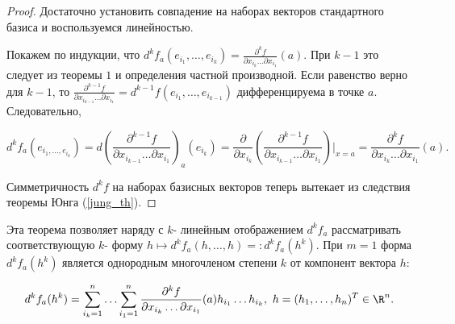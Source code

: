 \begin{proof}
    Достаточно установить совпадение на наборах векторов стандартного базиса и воспользуемся линейностью.

    Покажем по индукции, что $d^{k}f_{a}(e_{i_{1}}, \ldots, e_{i_{k}}) = \frac{\partial^k f}{\partial x_{i_{k}} \ldots \partial x_{i_{1}}}(a)$. При $k - 1$ это следует из теоремы $1$ и определения частной производной. Если равенство верно для $k - 1$, то $\frac{\partial^{k - 1} f}{\partial x_{i_{k - 1}} \ldots \partial x_{i_{1}}} = d^{k - 1}f(e_{i_{1}}, \ldots, e_{i_{k - 1}})$ дифференцируема в точке $a$. Следовательно,
    
    \[d^{k}f_{a}(e_{i_{1}, \ldots, e_{i_{k}}}) = d\left(\frac{\partial^{k - 1} f}{\partial x_{i_{k - 1}} \ldots \partial x_{i_{1}}}\right)_{a}(e_{i_{k}}) = \frac{\partial}{\partial x_{i_{k}}}\left(\frac{\partial^{k - 1} f}{\partial x_{i_{k - 1}} \ldots \partial x_{i_{1}}}\right)\vert_{x = a} = \frac{\partial^k f}{\partial x_{i_{k}} \ldots \partial x_{i_{1}}}(a).\]

    Симметричность $d^{k}f$ на наборах базисных векторов теперь вытекает из следствия теоремы Юнга (\ref{jung_th}).
\end{proof}

Эта теорема позволяет наряду с $k$- линейным отображением $d^{k}f_{a}$ рассматривать соответствующую $k$- форму $h \mapsto d^{k} f_{a}(h, \ldots, h) =: d^{k} f_{a}(h^{k})$. При $m = 1$ форма $d^{k}f_{a}(h^{k})$ является однородным многочленом степени $k$ от компонент вектора $h$:

\[d^{k}f_{a}(h^{k}) = \sum_{i_{k} = 1}^{n} \ldots \sum_{i_{1} = 1}^{n} \frac{\partial^k f}{\partial x_{i_{k}} \ldots \partial x_{i_{1}}}(a) h_{i_{1}} \ldots h_{i_{k}}, \ h = (h_{1}, \ldots, h_{n})^{T} \in \R^{n}.\]
